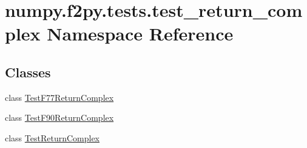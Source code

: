 \hypertarget{namespacenumpy_1_1f2py_1_1tests_1_1test__return__complex}{}\section{numpy.\+f2py.\+tests.\+test\+\_\+return\+\_\+complex Namespace Reference}
\label{namespacenumpy_1_1f2py_1_1tests_1_1test__return__complex}
\subsection*{Classes}
\begin{DoxyCompactItemize}
\item 
class \hyperlink{classnumpy_1_1f2py_1_1tests_1_1test__return__complex_1_1TestF77ReturnComplex}{Test\+F77\+Return\+Complex}
\item 
class \hyperlink{classnumpy_1_1f2py_1_1tests_1_1test__return__complex_1_1TestF90ReturnComplex}{Test\+F90\+Return\+Complex}
\item 
class \hyperlink{classnumpy_1_1f2py_1_1tests_1_1test__return__complex_1_1TestReturnComplex}{Test\+Return\+Complex}
\end{DoxyCompactItemize}
